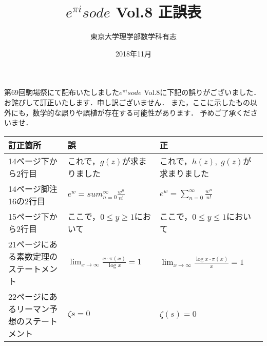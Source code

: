 \documentclass{jsarticle}
\title{$e^{\pi i}sode$ Vol.8 正誤表}
\date{2018年11月}
\author{東京大学理学部数学科有志}
\begin{document}
\maketitle

第69回駒場祭にて配布いたしました$e^{\pi i}sode$ Vol.8に下記の誤りがございました．
お詫びして訂正いたします．申し訳ございません．
また，ここに示したもの以外にも，数学的な誤りや誤植が存在する可能性があります．
予めご了承くださいませ．

\begin{table}[h]
\begin{center}
\begin{tabular}{lll}
訂正箇所&誤&正 \\\hline
14ページ下から2行目&これで，$g(z)$が求まりました&これで，$h(z),\;g(z)$が求まりました \\
14ページ脚注16の2行目&$e^w=sum^\infty_{n=0}\frac{w^n}{n!}$&$e^w=\sum^\infty_{n=0}\frac{w^n}{n!}$ \\
15ページ下から2行目&ここで，$0\leq y\geq 1$において&ここで，$0\leq y\leq 1$において \\
21ページにある素数定理のステートメント&$\displaystyle\lim_{x\to\infty}\frac{x\cdot\pi(x)}{\log x}=1$&$\displaystyle\lim_{x\to\infty}\frac{\log x\cdot\pi(x)}{x}=1$ \\
22ページにあるリーマン予想のステートメント&$\zeta{s}=0$&$\zeta(s)=0$
\end{tabular}
\end{center}
\end{table}
\end{document}
